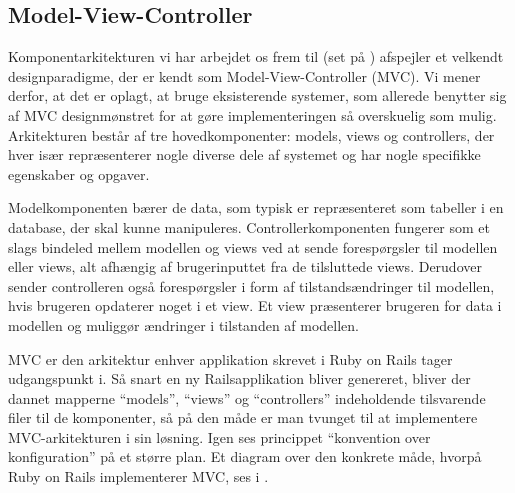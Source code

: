 \subsection{Model-View-Controller}
\label{subsec:mvc}
Komponentarkitekturen vi har arbejdet os frem til (set på ) afspejler et velkendt designparadigme, der er kendt som Model-View-Controller (MVC)\cite{designpatterns}. Vi mener derfor, at det er oplagt, at bruge eksisterende systemer, som allerede benytter sig af MVC designmønstret for at gøre implementeringen så overskuelig som mulig. Arkitekturen består af tre hovedkomponenter: models, views og controllers, der hver især repræsenterer nogle diverse dele af systemet og har nogle specifikke egenskaber og opgaver.

Modelkomponenten bærer de data, som typisk er repræsenteret som tabeller i en database, der skal kunne manipuleres. 
Controllerkomponenten fungerer som et slags bindeled mellem modellen og views ved at sende forespørgsler til modellen eller views, alt afhængig af brugerinputtet fra de tilsluttede views. Derudover sender controlleren også forespørgsler i form af tilstandsændringer til modellen, hvis brugeren \fx opdaterer noget i et view. Et view præsenterer brugeren for data i modellen og muliggør ændringer i tilstanden af modellen.


MVC er den arkitektur enhver applikation skrevet i Ruby on Rails tager udgangspunkt i. Så snart en ny Railsapplikation bliver genereret, bliver der dannet mapperne ``models'', ``views'' og ``controllers'' indeholdende tilsvarende filer til de komponenter, så på den måde er man tvunget til at implementere MVC-arkitekturen i sin løsning. Igen ses princippet ``konvention over konfiguration'' på et større plan. Et diagram over den konkrete måde, hvorpå Ruby on Rails implementerer MVC, ses i .
